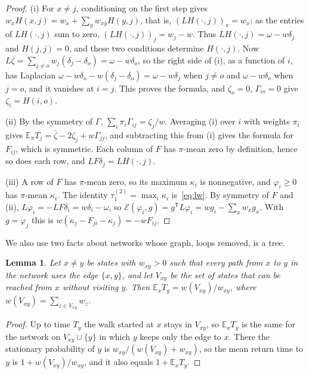 \documentclass[11pt]{amsart}
\newtheorem{lemma}[theorem]{Lemma}
\theoremstyle{definition}
\newcommand{\E}{\mathbb{E}}
\newcommand{\tmix}{\tau_1^{(2)}}
\begin{document}
\begin{proof}
(i) For $x\ne j$, conditioning on the first step gives $w_xH(x,j)=w_x+\sum_yw_{xy}H(y,j)$, that is,
$(LH(\cdot,j))_x=w_x$; as the entries of $LH(\cdot,j)$ sum to zero, $(LH(\cdot,j))_j=w_j-w$. Thus
$LH(\cdot,j)=\omega-w\delta_j$ and $H(j,j)=0$, and these two conditions determine $H(\cdot,j)$. Now
$L\zeta=\sum_{j\ne o}w_j(\delta_j-\delta_o)=\omega-w\delta_o$, so the right side of (i), as a function of $i$, has
Laplacian $\omega-w\delta_o-w(\delta_j-\delta_o)=\omega-w\delta_j$ when $j\ne o$ and $\omega-w\delta_o$ when $j=o$,
and it vanishes at $i=j$. This proves the formula, and $\zeta_o=0$, $\Gamma_{io}=0$ give $\zeta_i=H(i,o)$.

(ii) By the symmetry of $\Gamma$, $\sum_i\pi_i\Gamma_{ij}=\zeta_j/w$. Averaging (i) over $i$ with weights $\pi_i$
gives $\E_\pi T_j=\bar\zeta-2\zeta_j+w\Gamma_{jj}$, and subtracting this from (i) gives the formula for $F_{ij}$,
which is symmetric. Each column of $F$ has $\pi$-mean zero by definition, hence so does each row, and
$LF\delta_j=LH(\cdot,j)$.

(iii) A row of $F$ has $\pi$-mean zero, so its maximum $\kappa_i$ is nonnegative, and $\varphi_i\ge0$ has
$\pi$-mean $\kappa_i$. The identity $\tmix=\max_i\kappa_i$ is~\eqref{eq:lw}. By symmetry of $F$ and (ii),
$L\varphi_i=-LF\delta_i=w\delta_i-\omega$, so $\mathcal E(\varphi_i,g)=g^{\mathsf T}L\varphi_i=wg_i-\sum_xw_xg_x$.
With $g=\varphi_j$ this is $w(\kappa_j-F_{ji}-\kappa_j)=-wF_{ij}$.
\end{proof}

We also use two facts about networks whose graph, loops removed, is a tree.

\begin{lemma}\label{lem:bridge}
Let $x\ne y$ be states with $w_{xy}>0$ such that every path from $x$ to $y$ in the network uses the edge $\{x,y\}$,
and let $V_{xy}$ be the set of states that can be reached from $x$ without visiting $y$. Then
$\E_xT_y=w(V_{xy})/w_{xy}$, where $w(V_{xy})=\sum_{z\in V_{xy}}w_z$.
\end{lemma}
\begin{proof}
Up to time $T_y$ the walk started at $x$ stays in $V_{xy}$, so $\E_xT_y$ is the same for the network on
$V_{xy}\cup\{y\}$ in which $y$ keeps only the edge to $x$. There the stationary probability of $y$ is
$w_{xy}/(w(V_{xy})+w_{xy})$, so the mean return time to $y$ is $1+w(V_{xy})/w_{xy}$, and it also equals
$1+\E_xT_y$.
\end{proof}
\end{document}
